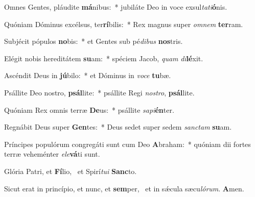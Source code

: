 \item Omnes Gentes, pláudite \textbf{má}nibus:~* jubiláte Deo in voce exsul\textit{ta}\textit{ti}\textbf{ó}nis.
\item Quóniam Dóminus excélsus, ter\textbf{rí}bilis:~* Rex magnus super \textit{om}\textit{nem} \textbf{ter}ram.
\item Subjécit pópulos \textbf{no}bis:~* et Gentes sub pé\textit{di}\textit{bus} \textbf{nos}tris.
\item Elégit nobis hereditátem \textbf{su}am:~* spéciem Jacob, \textit{quam} \textit{di}\textbf{lé}xit.
\item Ascéndit Deus in \textbf{jú}bilo:~* et Dóminus in \textit{vo}\textit{ce} \textbf{tu}bæ.
\item Psállite Deo nostro, \textbf{psál}lite:~* psállite Regi \textit{nos}\textit{tro}, \textbf{psál}lite.
\item Quóniam Rex omnis terræ \textbf{De}us:~* psállite \textit{sa}\textit{pi}\textbf{én}ter.
\item Regnábit Deus super \textbf{Gen}tes:~* Deus sedet super sedem \textit{sanc}\textit{tam} \textbf{su}am.
\item Príncipes populórum congregáti sunt cum Deo \textbf{A}braham:~* quóniam dii fortes terræ veheménter \textit{e}\textit{le}\textbf{vá}ti sunt.
\item Glória Patri, et \textbf{Fí}lio,~\psstar{} et Spirí\textit{tu}\textit{i} \textbf{Sanc}to.
\item Sicut erat in princípio, et nunc, et \textbf{sem}per,~\psstar{} et in sǽcula sæcu\textit{ló}\textit{rum}. \textbf{A}men.
